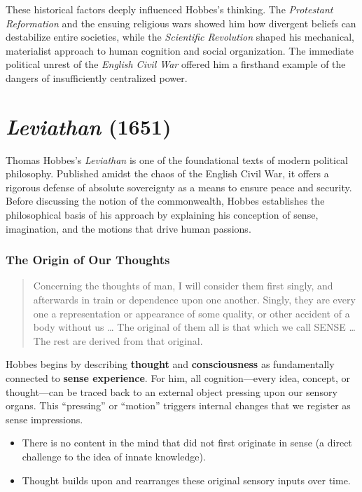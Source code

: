         These historical factors deeply influenced Hobbes’s thinking. The \textit{Protestant Reformation} and the ensuing religious wars showed him how divergent beliefs can destabilize entire societies, while the \textit{Scientific Revolution} shaped his mechanical, materialist approach to human cognition and social organization. The immediate political unrest of the \textit{English Civil War} offered him a firsthand example of the dangers of insufficiently centralized power.

\section{\textit{Leviathan} (1651)}

    Thomas Hobbes’s \textit{Leviathan} is one of the foundational texts of modern political philosophy. Published amidst the chaos of the English Civil War, it offers a rigorous defense of absolute sovereignty as a means to ensure peace and security. Before discussing the notion of the commonwealth, Hobbes establishes the philosophical basis of his approach by explaining his conception of sense, imagination, and the motions that drive human passions.

        \subsubsection{The Origin of Our Thoughts}

            \begin{quote}
                Concerning the thoughts of man, I will consider them first singly, and afterwards in train or dependence upon one another. Singly, they are every one a representation or appearance of some quality, or other accident of a body without us … The original of them all is that which we call SENSE … The rest are derived from that original.
            \end{quote}

            Hobbes begins by describing \textbf{thought} and \textbf{consciousness} as fundamentally connected to \textbf{sense experience}. For him, all cognition---every idea, concept, or thought---can be traced back to an external object pressing upon our sensory organs. This “pressing” or “motion” triggers internal changes that we register as sense impressions.

            \begin{remark}
                \begin{itemize}[leftmargin=*]
                    \item There is no content in the mind that did not first originate in sense (a direct challenge to the idea of innate knowledge).
                    \item Thought builds upon and rearranges these original sensory inputs over time.
                \end{itemize}
            \end{remark}

